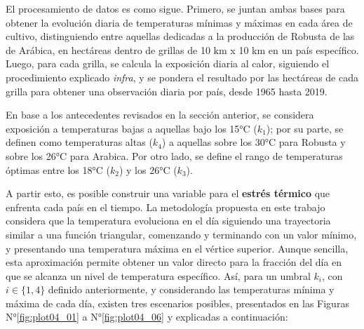 El procesamiento de datos es como sigue. Primero, se juntan ambas bases para obtener la evolución diaria de temperaturas mínimas y máximas en cada área de cultivo, distinguiendo entre aquellas dedicadas a la producción de Robusta de las de Arábica, en hectáreas dentro de grillas de 10 km x 10 km en un país específico. Luego, para cada grilla, se calcula la exposición diaria al calor, siguiendo el procedimiento explicado \textit{infra}, y se pondera el resultado por las hectáreas de cada grilla para obtener una observación diaria por país, desde 1965 hasta 2019.

En base a los antecedentes revisados en la sección anterior, se considera exposición a temperaturas bajas a aquellas bajo los 15°C ($k_{1}$); por su parte, se definen como temperaturas altas ($k_{4}$) a aquellas sobre los 30°C para Robusta y sobre los 26°C para Arabica. Por otro lado, se define el rango de temperaturas óptimas entre los 18°C ($k_{2}$) y los 26°C ($k_{3}$).

A partir esto, es posible construir una variable para el \textbf{estrés térmico} que enfrenta cada país en el tiempo. La metodología propuesta en este trabajo considera que la temperatura evoluciona en el día siguiendo una trayectoria similar a una función triangular, comenzando y terminando con un valor mínimo, y presentando una temperatura máxima en el vértice superior. Aunque sencilla, esta aproximación permite obtener un valor directo para la fracción del día en que se alcanza un nivel de temperatura específico. Así, para un umbral $k_{i}$, con $i \in \{1, 4\}$ definido anteriormente, y considerando las temperaturas mínima y máxima de cada día, existen tres escenarios posibles, presentados en las Figuras N°\ref{fig:plot04_01} a N°\ref{fig:plot04_06} y explicadas a continuación:

